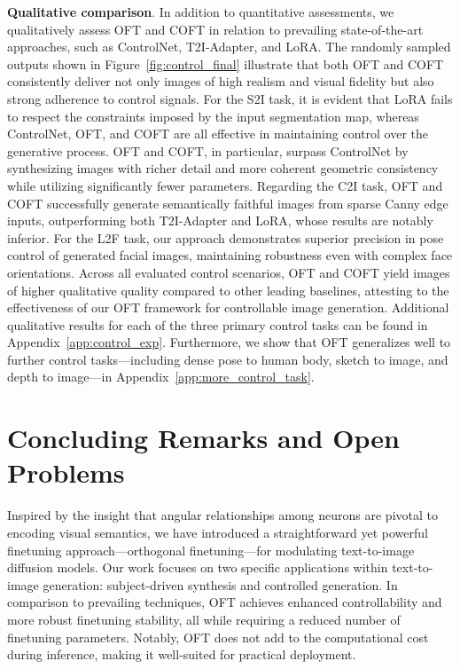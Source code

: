 \textbf{Qualitative comparison}. In addition to quantitative assessments, we qualitatively assess OFT and COFT in relation to prevailing state-of-the-art approaches, such as ControlNet, T2I-Adapter, and LoRA. The randomly sampled outputs shown in Figure~\ref{fig:control_final} illustrate that both OFT and COFT consistently deliver not only images of high realism and visual fidelity but also strong adherence to control signals. For the S2I task, it is evident that LoRA fails to respect the constraints imposed by the input segmentation map, whereas ControlNet, OFT, and COFT are all effective in maintaining control over the generative process. OFT and COFT, in particular, surpass ControlNet by synthesizing images with richer detail and more coherent geometric consistency while utilizing significantly fewer parameters. Regarding the C2I task, OFT and COFT successfully generate semantically faithful images from sparse Canny edge inputs, outperforming both T2I-Adapter and LoRA, whose results are notably inferior. For the L2F task, our approach demonstrates superior precision in pose control of generated facial images, maintaining robustness even with complex face orientations. Across all evaluated control scenarios, OFT and COFT yield images of higher qualitative quality compared to other leading baselines, attesting to the effectiveness of our OFT framework for controllable image generation. Additional qualitative results for each of the three primary control tasks can be found in Appendix~\ref{app:control_exp}. Furthermore, we show that OFT generalizes well to further control tasks—including dense pose to human body, sketch to image, and depth to image—in Appendix~\ref{app:more_control_task}.

\section{Concluding Remarks and Open Problems}

Inspired by the insight that angular relationships among neurons are pivotal to encoding visual semantics, we have introduced a straightforward yet powerful finetuning approach—orthogonal finetuning—for modulating text-to-image diffusion models. Our work focuses on two specific applications within text-to-image generation: subject-driven synthesis and controlled generation. In comparison to prevailing techniques, OFT achieves enhanced controllability and more robust finetuning stability, all while requiring a reduced number of finetuning parameters. Notably, OFT does not add to the computational cost during inference, making it well-suited for practical deployment.

